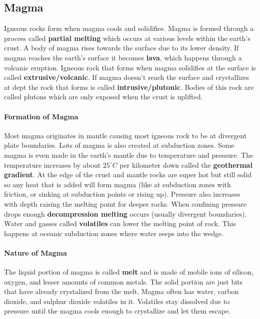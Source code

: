 \documentclass{article}
\begin{document}
\subsection{Magma} %
\label{sub:magma}
Igneous rocks form when magma cools and solidifies. Magma is formed through a process called \textbf{partial melting} which occurs at various levels within the earth's crust. A body of magma rises towards the surface due to its lower density. If magma reaches the earth's surface it becomes \textbf{lava}, which happens through a volcanic eruption. Igneous rock that forms when magma solidifies at the surface is called \textbf{extrusive/volcanic}. If magma doesn't reach the surface and crystallizes at dept the rock that forms is called \textbf{intrusive/plutonic}. Bodies of this rock are called plutons which are only exposed when the crust is uplifted.

\paragraph{Formation of Magma} %
\label{par:formation_of_magma}
Most magma originates in mantle causing most igneous rock to be at divergent plate boundaries. Lots of magma is also created at subduction zones. Some magma is even made in the earth's mantle due to temperature and pressure. The temperature increases by about $25^{\circ} C$ per kilometer down called the \textbf{geothermal gradient}. At the edge of the crust and mantle rocks are super hot but still solid so any heat that is added will form magma (like at subduction zones with friction, or sinking at subduction points or rising up). Pressure also increases with depth raising the melting point for deeper rocks. When confining pressure drops enough \textbf{decompression melting} occurs (usually divergent boundaries). Water and gasses called \textbf{volatiles} can lower the melting point of rock. This happens at oceanic subduction zones where water seeps into the wedge.

\paragraph{Nature of Magma} %
\label{par:nature_of_magma}
The liquid portion of magma is called \textbf{melt} and is made of mobile ions of silicon, oxygen, and lesser amounts of common metals. The solid portion are just bits that have already crystalized from the melt. Magma often has water, carbon dioxide, and sulphur dioxide volatiles in it. Volatiles stay dissolved due to pressure until the magma cools enough to crystallize and let them escape.
\end{document}
